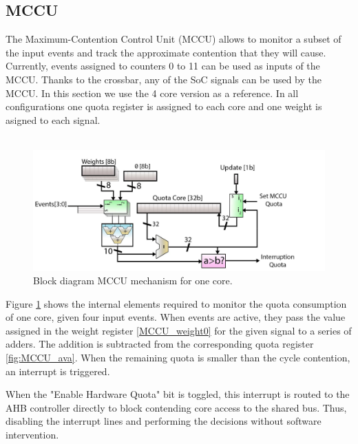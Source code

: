 \subsection{MCCU}
The Maximum-Contention Control Unit (MCCU) allows to monitor a subset of the input events and track the approximate contention that they will cause. Currently, events assigned to counters 0 to 11 can be used as inputs of the MCCU. Thanks to the crossbar, any of the SoC signals can be used by the MCCU. In this section we use the 4 core version as a reference. In all configurations one quota register is assigned to each core and one weight is asigned to each signal.\\
\\
\begin{figure}[H]
	\includegraphics[keepaspectratio,width=\columnwidth]{img/bd_MCCU.png}
	\caption{Block diagram MCCU mechanism for one core.}
	\label{fig:blk_MCCU}
\end{figure}
Figure \ref{fig:blk_MCCU} shows the internal elements required to monitor the quota consumption of one core, given four input events.  When events are active, they pass the value assigned in the weight register \ref{MCCU_weight0} for the given signal to a series of adders. The addition is subtracted from the corresponding quota register \ref{fig:MCCU_ava}. When the remaining quota is smaller than the cycle contention, an interrupt is triggered.

When the "Enable Hardware Quota" bit is toggled, this interrupt is routed to the AHB controller directly to block contending core access to the shared bus. Thus, disabling the interrupt lines and performing the decisions without software intervention.


